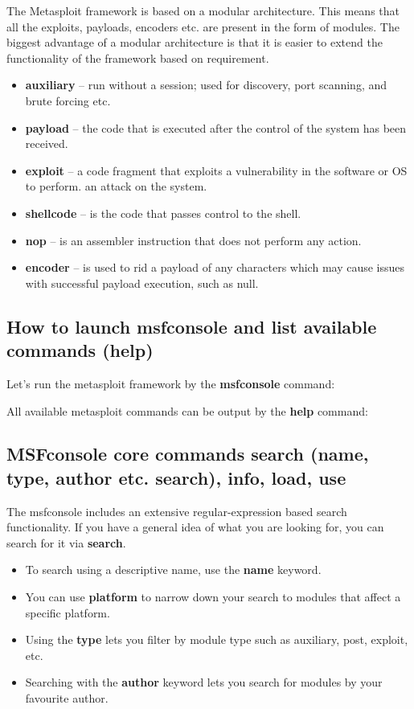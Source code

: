 \documentclass[14pt,a4paper,report]{report}
\begin{document}
The Metasploit framework is based on a modular architecture. This means that all the exploits, payloads, encoders etc. are present in the form of modules. The biggest advantage of a modular architecture is that it is easier to extend the functionality of the framework based on requirement.

\begin{itemize}
	\item \textbf{auxiliary} -- run without a session; used for discovery, port scanning, and brute forcing etc.
	\item \textbf{payload} -- the code that is executed after the control of the system has been received.
	\item \textbf{exploit} -- a code fragment that exploits a vulnerability in the software or OS to perform.
	an attack on the system.
	\item \textbf{shellcode} -- is the code that passes control to the shell.
	\item \textbf{nop} -- is an assembler instruction that does not perform any action.
	\item \textbf{encoder} --  is used to rid a payload of any characters which may cause issues with successful payload execution, such as null.
\end{itemize}

\subsection{How to launch msfconsole and list available commands (help)}

Let's run the metasploit framework by the \textbf{msfconsole} command:



All available metasploit commands can be output by the \textbf{help} command:



\subsection{MSFconsole core commands search (name, type, author etc. search), info, load, use}

The msfconsole includes an extensive regular-expression based search functionality. If you have a general idea of what you are looking for, you can search for it via \textbf{search}.

\begin{itemize}
	\item To search using a descriptive name, use the \textbf{name} keyword.
	\item You can use \textbf{platform} to narrow down your search to modules that affect a specific platform.
	\item Using the \textbf{type} lets you filter by module type such as auxiliary, post, exploit, etc.
	\item Searching with the \textbf{author} keyword lets you search for modules by your favourite author.
\end{itemize}
\end{document}
